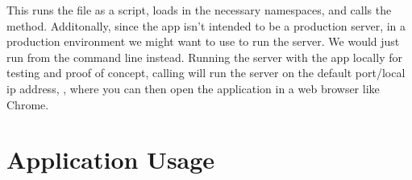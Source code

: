 \documentclass[letterpaper,10pt,english]{sphinxmanual}
\begin{document}
\begin{sphinxVerbatim}[commandchars=\\\{\}]
 
\end{sphinxVerbatim}

\sphinxAtStartPar
This runs the file as a script, loads in the necessary namespaces, and
calls the  method. Additonally, since the 
app isn’t intended to be a production server, in a production
environment we might want to use  to run the server. We
would just run  from the command line
instead. Running the server with the  app locally for testing
and proof of concept, calling  will run the server
on the default port/local ip address, , where you
can then open the application in a web browser like Chrome.


\section{Application Usage}
\label{\detokenize{dashapp_documentation:application-usage}}
\end{document}
